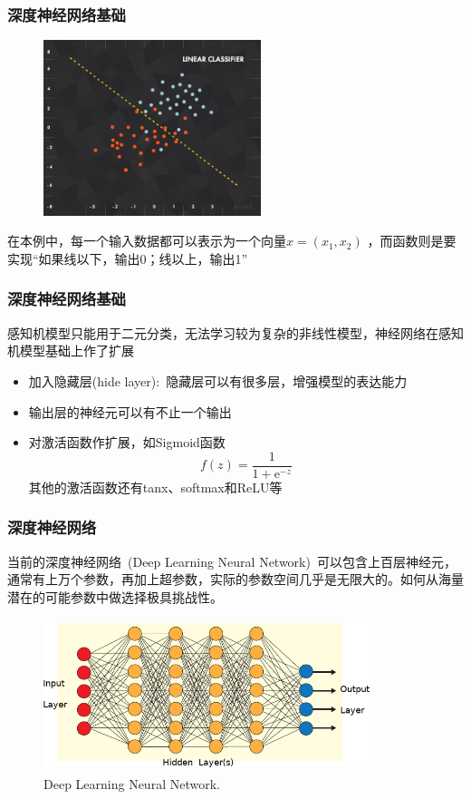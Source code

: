 \documentclass[cjk,slidestop,compress,mathserif,blue]{beamer}
\begin{document}
\frame
{
	\frametitle{深度神经网络基础}
\begin{figure}[h!]
\vspace*{-0.08in}
\centering
\includegraphics[width=2.5in]{Figures/NN_PLA_example.png}
\label{Fig:PLA}
\end{figure}
在本例中，每一个输入数据都可以表示为一个向量$x = (x_1, x_2)$ ，而函数则是要实现“如果线以下，输出0；线以上，输出1”
}

\frame
{
	\frametitle{深度神经网络基础}
感知机模型只能用于二元分类，无法学习较为复杂的非线性模型，神经网络在感知机模型基础上作了扩展
\vskip 10pt
	\begin{itemize}
		\item 加入隐藏层(\textrm{hide layer}):~隐藏层可以有很多层，增强模型的表达能力
		\item 输出层的神经元可以有不止一个输出
		\item 对激活函数作扩展，如\textrm{Sigmoid}函数
			\begin{displaymath}
				f(z)=\dfrac1{1+\mathrm{e}^{-z}}
			\end{displaymath}
			其他的激活函数还有\textrm{tanx}、\textrm{softmax}和\textrm{ReLU}等
	\end{itemize}
}

\frame
{
	\frametitle{深度神经网络}
当前的深度神经网络~\textrm{(Deep Learning Neural Network)}~可以包含上百层神经元，通常有上万个参数，再加上超参数，实际的参数空间几乎是无限大的。如何从海量潜在的可能参数中做选择极具挑战性。
\begin{figure}[h!]
\vspace*{-0.08in}
\centering
\includegraphics[height=1.75in,width=3.75in]{Figures/ANN_Algorithm.png}
\caption{\tiny \textrm{Deep Learning Neural Network.}}%
\label{Fig:Deep-Learning-NN}
\end{figure}
}
\end{document}
